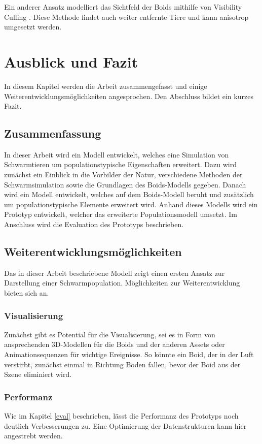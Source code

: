 \documentclass[draft=false
              ,paper=a4
              ,twoside=false
              ,fontsize=11pt
              ,headsepline
              ,BCOR10mm
              ,DIV11
              ,bibtotoc
              ,liststotoc
              ]{scrbook}
\begin{document}
Ein anderer Ansatz modelliert das Sichtfeld der Boids mithilfe von Visibility Culling \cite{journals/cie/SilvaLC09}. Diese Methode findet auch weiter entfernte Tiere und kann anisotrop umgesetzt werden.

\chapter{Ausblick und Fazit}\label{fazit}
In diesem Kapitel werden die Arbeit zusammengefasst und einige Weiterentwicklungsmöglichkeiten angesprochen. Den Abschluss bildet ein kurzes Fazit.
\section{Zusammenfassung}
In dieser Arbeit wird ein Modell entwickelt, welches eine Simulation von Schwarmtieren um populationstypische Eigenschaften erweitert. Dazu wird zunächst ein Einblick in die Vorbilder der Natur, verschiedene Methoden der Schwarmsimulation sowie die Grundlagen des Boids-Modells gegeben. Danach wird ein Modell entwickelt, welches auf dem Boids-Modell beruht und zusätzlich um populationstypische Elemente erweitert wird. Anhand dieses Modells wird ein Prototyp entwickelt, welcher das erweiterte Populationsmodell umsetzt. Im Anschluss wird die Evaluation des Prototyps beschrieben.
\section{Weiterentwicklungsmöglichkeiten}
Das in dieser Arbeit beschriebene Modell zeigt einen ersten Ansatz zur Darstellung einer Schwarmpopulation. Möglichkeiten zur Weiterentwicklung bieten sich an.
\subsection{Visualisierung}
Zunächst gibt es Potential für die Visualisierung, sei es in Form von ansprechenden 3D-Modellen für die Boids und der anderen Assets oder Animationsequenzen für wichtige Ereignisse. So könnte ein Boid, der in der Luft verstirbt, zunächst einmal in Richtung Boden fallen, bevor der Boid aus der Szene eliminiert wird.

\subsection{Performanz}
Wie im Kapitel \ref{eval} beschrieben, lässt die Performanz des Prototyps noch deutlich Verbesserungen zu. Eine Optimierung der Datenstrukturen kann hier angestrebt werden.
\end{document}
